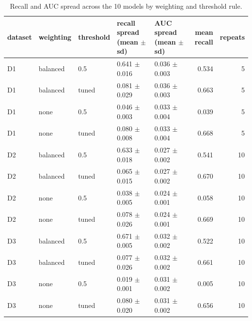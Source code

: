 \begin{table}[t]
\centering
\caption{Recall and AUC spread across the 10 models by weighting and threshold rule.}
\label{tab:T3_weighting_x_threshold}
\small
\begin{tabular}{lllllrr}
\toprule
dataset & weighting & threshold & recall spread (mean $\pm$ sd) & AUC spread (mean $\pm$ sd) & mean recall & repeats \\
\midrule
D1 & balanced & 0.5 & 0.641 $\pm$ 0.016 & 0.036 $\pm$ 0.003 & 0.534 & 5 \\
D1 & balanced & tuned & 0.081 $\pm$ 0.029 & 0.036 $\pm$ 0.003 & 0.663 & 5 \\
D1 & none & 0.5 & 0.046 $\pm$ 0.003 & 0.033 $\pm$ 0.004 & 0.039 & 5 \\
D1 & none & tuned & 0.080 $\pm$ 0.008 & 0.033 $\pm$ 0.004 & 0.668 & 5 \\
D2 & balanced & 0.5 & 0.633 $\pm$ 0.018 & 0.027 $\pm$ 0.002 & 0.541 & 10 \\
D2 & balanced & tuned & 0.065 $\pm$ 0.015 & 0.027 $\pm$ 0.002 & 0.670 & 10 \\
D2 & none & 0.5 & 0.038 $\pm$ 0.005 & 0.024 $\pm$ 0.001 & 0.058 & 10 \\
D2 & none & tuned & 0.078 $\pm$ 0.026 & 0.024 $\pm$ 0.001 & 0.669 & 10 \\
D3 & balanced & 0.5 & 0.671 $\pm$ 0.005 & 0.032 $\pm$ 0.002 & 0.522 & 10 \\
D3 & balanced & tuned & 0.077 $\pm$ 0.026 & 0.032 $\pm$ 0.002 & 0.661 & 10 \\
D3 & none & 0.5 & 0.019 $\pm$ 0.001 & 0.031 $\pm$ 0.002 & 0.005 & 10 \\
D3 & none & tuned & 0.080 $\pm$ 0.020 & 0.031 $\pm$ 0.002 & 0.656 & 10 \\
\bottomrule
\end{tabular}
\end{table}
